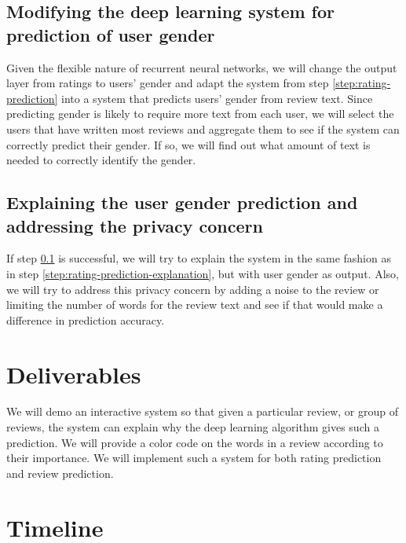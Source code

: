 \documentclass[11pt]{article}
\begin{document}
\subsection{Modifying the deep learning system for prediction of user gender}
\label{step:gender-prediction}

Given the flexible nature of recurrent neural networks, we will change the output layer from ratings to users' gender and adapt the system from step \ref{step:rating-prediction} into a system that predicts users' gender from review text. Since predicting gender is likely to require more text from each user, we will select the users that have written most reviews and aggregate them to see if the system can correctly predict their gender. If so, we will find out what amount of text is needed to correctly identify the gender.

\subsection{Explaining the user gender prediction and addressing the privacy concern}

If step \ref{step:gender-prediction} is successful, we will try to explain the system in the same fashion as in step \ref{step:rating-prediction-explanation}, but with user gender as output. Also, we will try to address this privacy concern by adding a noise to the review or limiting the number of words for the review text and see if that would make a difference in prediction accuracy. 

\section{Deliverables}

We will demo an interactive system so that given a particular review, or group of reviews, the system can explain why the deep learning algorithm gives such a prediction. We will provide a color code on the words in a review according to their importance. We will implement such a system for both rating prediction and review prediction. 

\section{Timeline}
\end{document}
